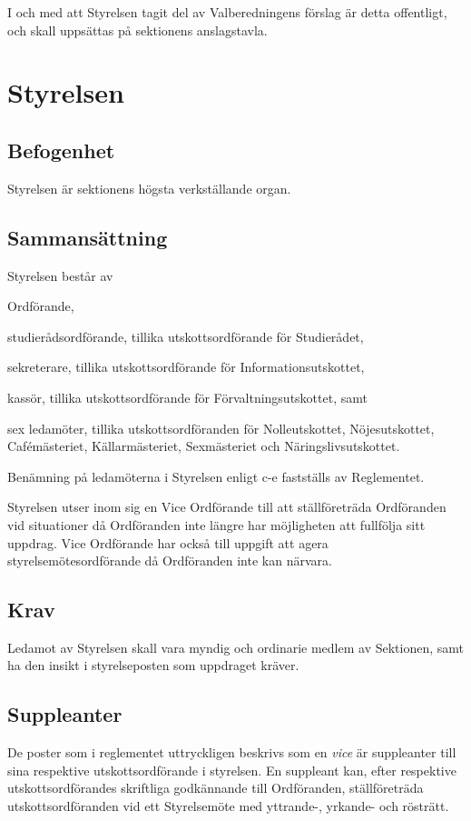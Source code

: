 \documentclass[10pt]{article}
\begin{document}
    I och med att Styrelsen tagit del av Valberedningens förslag är detta
    offentligt, och skall uppsättas på sektionens anslagstavla.
    \newpage
    
    \section{Styrelsen}
    \subsection{Befogenhet}
    Styrelsen är sektionens högsta verkställande organ.
    
    \subsection{Sammansättning}
    Styrelsen består av
    \begin{alphlist}
    \item Ordförande,
    \item studierådsordförande, tillika utskottsordförande för Studierådet,
    \item sekreterare, tillika utskottsordförande för Informationsutskottet,
    \item kassör, tillika utskottsordförande för Förvaltningsutskottet, samt
    \item sex ledamöter, tillika utskottsordföranden för Nolleutskottet,
        Nöjesutskottet, Cafémästeriet, Källarmästeriet, Sexmästeriet och
        Näringslivsutskottet.
    \end{alphlist}
    
    Benämning på ledamöterna i Styrelsen enligt c-e fastställs av Reglementet.
    
    Styrelsen utser inom sig en Vice Ordförande till att ställföreträda Ordföranden vid situationer då Ordföranden inte längre har möjligheten att fullfölja sitt uppdrag. Vice Ordförande har också till uppgift att agera styrelsemötesordförande då Ordföranden inte kan närvara.
    
    \subsection{Krav}
    Ledamot av Styrelsen skall vara myndig och ordinarie medlem av Sektionen,
    samt ha den insikt i styrelseposten som uppdraget kräver.
    
    \subsection{Suppleanter}
    De poster som i reglementet uttryckligen beskrivs som en \emph{vice} är suppleanter till sina respektive utskottsordförande i styrelsen. En suppleant kan, efter respektive utskottsordförandes skriftliga godkännande till Ordföranden, ställföreträda utskottsordföranden vid ett Styrelsemöte med yttrande-, yrkande- och rösträtt.
\end{document}
